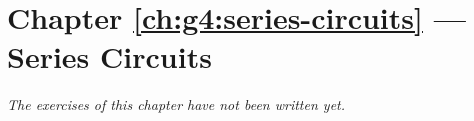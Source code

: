 \section*{Chapter \ref{ch:g4:series-circuits} --- Series Circuits}


\emph{The exercises of this chapter have not been written yet.}
